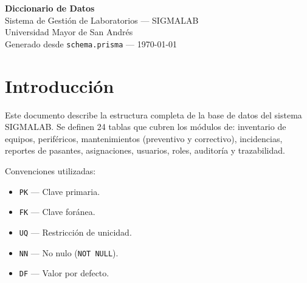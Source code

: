 \documentclass[12pt,a4paper]{article}
\begin{document}
\begin{titlepage}
\centering
\vspace*{4cm}
{\Huge\color{navy}\textbf{Diccionario de Datos}}\\[0.8cm]
{\Large Sistema de Gestión de Laboratorios --- SIGMALAB}\\[0.4cm]
{\large Universidad Mayor de San Andrés}\\[2cm]
\vfill
{\small Generado desde \texttt{schema.prisma} --- \today}
\end{titlepage}

\tableofcontents
\newpage

\section{Introducción}

Este documento describe la estructura completa de la base de datos del sistema SIGMALAB.
Se definen 24 tablas que cubren los módulos de: inventario de equipos, periféricos,
mantenimientos (preventivo y correctivo), incidencias, reportes de pasantes,
asignaciones, usuarios, roles, auditoría y trazabilidad.

Convenciones utilizadas:
\begin{itemize}[nosep]
  \item \texttt{PK} --- Clave primaria.
  \item \texttt{FK} --- Clave foránea.
  \item \texttt{UQ} --- Restricción de unicidad.
  \item \texttt{NN} --- No nulo (\texttt{NOT NULL}).
  \item \texttt{DF} --- Valor por defecto.
\end{itemize}

\newpage
\end{document}
